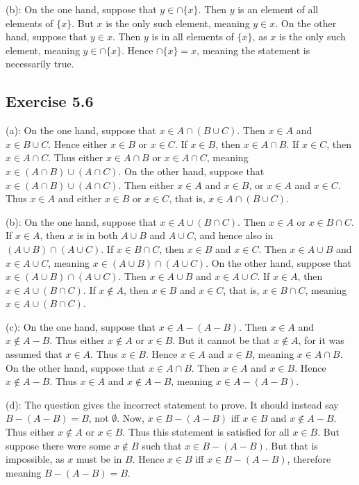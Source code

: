 \documentclass{article}
\theoremstyle{definition}
\begin{document}
(b): On the one hand, suppose that $y\in\cap\{x\}$. Then $y$ is an element of all elements of $\{x\}$. But $x$ is the only such element, meaning $y\in x$. On the other hand, 
suppose that $y\in x$. Then $y$ is in all elements of $\{x\}$, as $x$ is the only such element, meaning $y\in\cap\{x\}$. Hence $\cap\{x\}=x$, meaning the statement is 
necessarily true. 

\subsection*{Exercise 5.6}
(a): On the one hand, suppose that $x\in A\cap (B\cup C)$. Then $x\in A$ and $x\in B\cup C$. Hence either $x\in B$ or $x\in C$. If 
$x\in B$, then $x\in A\cap B$. If $x\in C$, then $x\in A\cap C$. Thus either $x\in A\cap B$ or $x\in A\cap C$, meaning
$x\in (A\cap B)\cup (A\cap C)$. On the other hand, suppose that $x\in (A\cap B)\cup (A\cap C)$. Then either $x\in A$ and $x\in B$, or 
$x\in A$ and $x\in C$. Thus $x\in A$ and either $x\in B$ or $x\in C$, that is, $x\in A\cap (B\cup C)$.


(b): On the one hand, suppose that $x\in A\cup (B\cap C)$. Then $x\in A$ or $x\in B\cap C$. If $x\in A$, then 
$x$ is in both $A\cup B$ and $A\cup C$, and hence also in $(A\cup B)\cap (A\cup C)$. If $x\in B\cap C$, then $x\in B$ and $x\in C$. 
Then $x\in A\cup B$ and $x\in A\cup C$, meaning $x\in (A\cup B)\cap (A\cup C)$. On the other hand, suppose that 
$x\in (A\cup B)\cap (A\cup C)$. Then $x\in A\cup B$ and $x\in A\cup C$. If $x\in A$, then $x\in A\cup (B\cap C)$. If $x\notin A$, then 
$x\in B$ and $x\in C$, that is, $x\in B\cap C$, meaning $x\in A\cup (B\cap C)$.


(c): On the one hand, suppose that $x\in A-(A-B)$. Then $x\in A$ and $x\notin A-B$. Thus either $x\notin A$ or $x\in B$. But it cannot be that $x\notin A$, for 
it was assumed that $x\in A$. Thus $x\in B$. Hence $x\in A$ and $x\in B$, meaning $x\in A\cap B$. On the other hand, suppose that $x\in A\cap B$. Then $x\in A$ and 
$x\in B$. Hence $x\notin A-B$. Thus $x\in A$ and $x\notin A-B$, meaning $x\in A-(A-B)$.


(d): The question gives the incorrect statement to prove. It should instead say $B-(A-B)=B$, not $\emptyset$. 
Now, $x\in B-(A-B)$ iff $x\in B$ and $x\notin A-B$. Thus either $x\notin A$ or $x\in B$. Thus this statement is satisfied for all $x\in B$. But 
suppose there were some $x\notin B$ such that $x\in B-(A-B)$. But that is impossible, as $x$ must be in $B$. Hence $x\in B$ iff $x\in B-(A-B)$, therefore meaning 
$B-(A-B)=B$.
\end{document}

